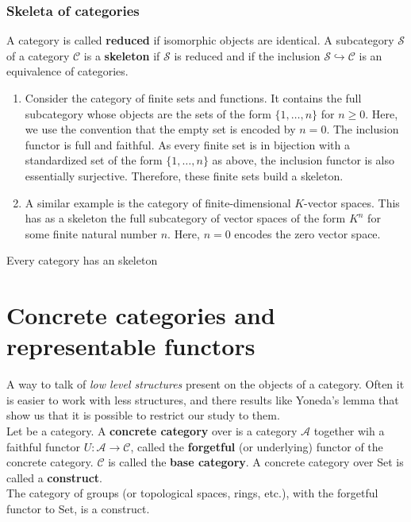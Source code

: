 \subsubsection*{Skeleta of categories}
 A category is called \textbf{reduced} if isomorphic objects are identical. A subcategory $\mathcal{S}$ of a category $\mathcal{C}$ is a \textbf{skeleton} if $\mathcal{S}$ is reduced and if the inclusion $\mathcal{S} \hookrightarrow \mathcal{C}$ is an equivalence of categories.
\begin{example}
    
    \begin{enumerate}
        
        \item Consider the category of finite sets and functions. It contains the full subcategory whose objects are the sets of the form $\{1, \ldots, n\}$ for $n \geq 0$. Here, we use the convention that the empty set is encoded by $n=0$. The inclusion functor is full and faithful. As every finite set is in bijection with a standardized set of the form $\{1, \ldots, n\}$ as above, the inclusion functor is also essentially surjective. Therefore, these finite sets build a skeleton.
        
        \item A similar example is the category of finite-dimensional $K$-vector spaces. This has as a skeleton the full subcategory of vector spaces of the form $K^n$ for some finite natural number $n$. Here, $n=0$ encodes the zero vector space.
    \end{enumerate}
\end{example}


\begin{prop}
    Every category has an skeleton
\end{prop}





\section{Concrete categories and representable functors}

A way to talk of \textit{low level structures} present on the objects of a category. Often it is easier to work with less structures, and there results like Yoneda's lemma that show us that it is possible to restrict our study to them.\\

Let \cc be a category. A \textbf{concrete category} over \cc is a category $\mathcal{A}$ together wih a faithful functor $U: \mathcal{A} \rightarrow \mathcal{C}$, called the \textbf{forgetful} (or underlying) functor of the concrete category. $\mathcal{C}$ is called the \textbf{base category}. A concrete category over Set is called a \textbf{construct}.\\
The category of groups (or topological spaces, rings, etc.), with the forgetful functor to Set, is a construct.\\

